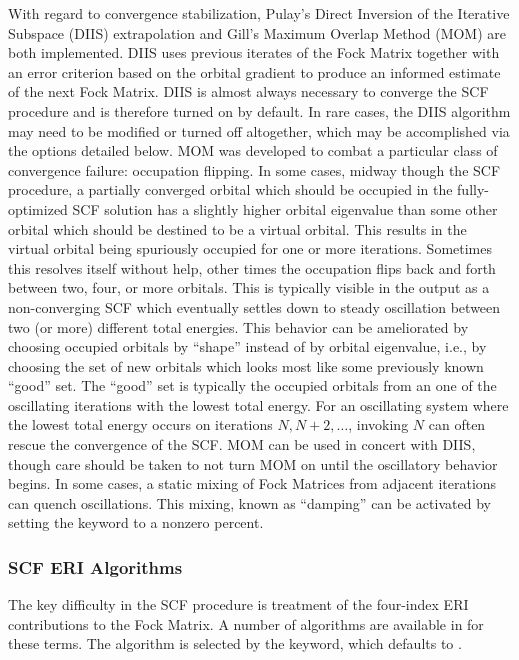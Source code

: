 With regard to convergence stabilization, Pulay's Direct Inversion of the
Iterative Subspace (DIIS) extrapolation and Gill's Maximum Overlap Method (MOM)
are both implemented. DIIS uses previous iterates of the Fock Matrix together
with an error criterion based on the orbital gradient to produce an informed
estimate of the next Fock Matrix. DIIS is almost always necessary to converge
the SCF procedure and is therefore turned on by default. In rare cases, the
DIIS algorithm may need to be modified or turned off altogether, which may be
accomplished via the options detailed below. MOM was developed to combat a
particular class of convergence failure: occupation flipping. In some cases,
midway though the SCF procedure, a partially converged orbital which should be
occupied in the fully-optimized SCF solution has a slightly higher orbital
eigenvalue than some other orbital which should be destined to be a virtual
orbital. This results in the virtual orbital being spuriously occupied for one
or more iterations. Sometimes this resolves itself without help, other times the
occupation flips back and forth between two, four, or more orbitals. This is
typically visible in the output as a non-converging SCF which eventually settles
down to steady oscillation between two (or more) different total energies. This
behavior can be ameliorated by choosing occupied orbitals by ``shape'' instead
of by orbital eigenvalue, i.e., by choosing the set of new orbitals which looks
most like some previously known ``good'' set.  The ``good'' set is typically the
occupied orbitals from an one of the oscillating iterations with the lowest
total energy. For an oscillating system where the lowest total energy occurs on
iterations $N,N+2,\ldots$, invoking  $N$ can often rescue the
convergence of the SCF. MOM can be used in concert with DIIS, though care should
be taken to not turn MOM on until the oscillatory behavior begins. In some
cases, a static mixing of Fock Matrices from adjacent iterations can quench
oscillations. This mixing, known as ``damping'' can be activated by setting the
 keyword to a nonzero percent. 

\subsubsection{SCF ERI Algorithms}

The key difficulty in the SCF procedure is treatment of the four-index ERI
contributions to the Fock Matrix. A number of algorithms are available in
\PSIfour for these terms. The algorithm is selected by the 
keyword, which defaults to . 

